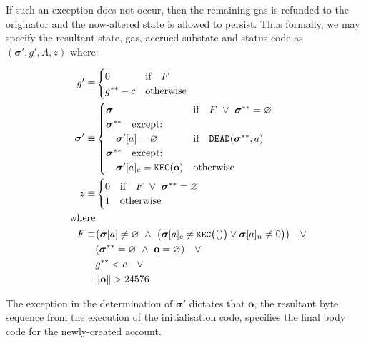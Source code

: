 \documentclass[9pt,oneside]{amsart}
\begin{document}
\begin{multicols}{2}
If such an exception does not occur, then the remaining gas is refunded to the originator and the now-altered state is allowed to persist. Thus formally, we may specify the resultant state, gas, accrued substate and status code as $(\boldsymbol{\sigma}', g', A, z)$ where:

\begin{align}
\quad g' \equiv & \begin{cases}
0 & \text{if} \quad F \\
g^{**} - c & \text{otherwise} \\
\end{cases} \\
\quad \boldsymbol{\sigma}' \equiv & \begin{cases}
\boldsymbol{\sigma} & \text{if} \quad F \ \lor\ \boldsymbol{\sigma}^{**} = \varnothing \\
\boldsymbol{\sigma}^{**} \quad \text{except:} & \\
\quad\boldsymbol{\sigma}'[a] = \varnothing & \text{if} \quad \mathtt{DEAD}(\boldsymbol{\sigma}^{**}, a) \\
\boldsymbol{\sigma}^{**} \quad \text{except:} & \\
\quad\boldsymbol{\sigma}'[a]_{\mathrm{c}} = \texttt{KEC}(\mathbf{o}) & \text{otherwise}
\end{cases} \\
\quad z \equiv & \begin{cases}
0 & \text{if} \quad F \ \lor\ \boldsymbol{\sigma}^{**} = \varnothing \\
1 & \text{otherwise}
\end{cases} \\
\nonumber \text{where} \\
F \equiv  & \big( \boldsymbol{\sigma}[a] \neq \varnothing \ \wedge\ \big(\boldsymbol{\sigma}[a]_c \neq \texttt{\small KEC}\big(()\big) \vee \boldsymbol{\sigma}[a]_n \neq 0 \big) \big) \quad \vee \\
\nonumber &(\boldsymbol{\sigma}^{**} = \varnothing \ \wedge\ \mathbf{o} = \varnothing) \quad \vee \\
\nonumber &g^{**} < c \quad \vee \\
\nonumber &\lVert \mathbf{o} \rVert > 24576
\end{align}

The exception in the determination of $\boldsymbol{\sigma}'$ dictates that $\mathbf{o}$, the resultant byte sequence from the execution of the initialisation code, specifies the final body code for the newly-created account.


\end{multicols}
\end{document}

